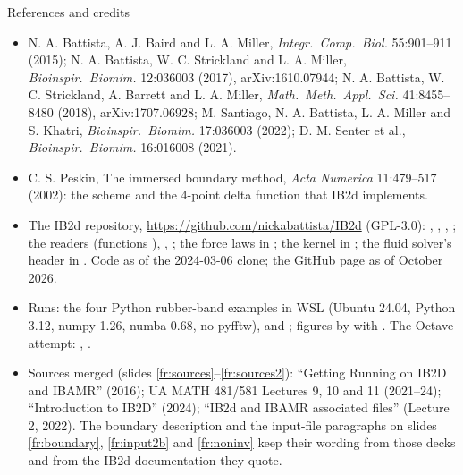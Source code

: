 \documentclass[aspectratio=169,11pt]{beamer}
\begin{document}
\begin{frame}{References and credits}
\label{fr:refs}
\scriptsize
\begin{itemize}
  \item N. A. Battista, A. J. Baird and L. A. Miller, \emph{Integr.\ Comp.\ Biol.} 55:901--911 (2015); N. A. Battista, W. C. Strickland and L. A. Miller, \emph{Bioinspir.\ Biomim.} 12:036003 (2017), arXiv:1610.07944; N. A. Battista, W. C. Strickland, A. Barrett and L. A. Miller, \emph{Math.\ Meth.\ Appl.\ Sci.} 41:8455--8480 (2018), arXiv:1707.06928; M. Santiago, N. A. Battista, L. A. Miller and S. Khatri, \emph{Bioinspir.\ Biomim.} 17:036003 (2022); D. M. Senter et al., \emph{Bioinspir.\ Biomim.} 16:016008 (2021).
  \item C. S. Peskin, The immersed boundary method, \emph{Acta Numerica} 11:479--517 (2002): the scheme and the 4-point delta function that IB2d implements.
  \item The IB2d repository, \url{https://github.com/nickabattista/IB2d} (GPL-3.0): , , , ; the readers  (functions ), , ; the force laws in ; the kernel in ; the fluid solver's header in . Code as of the 2024-03-06 clone; the GitHub page as of October 2026.
  \item Runs: the four Python rubber-band examples in WSL (Ubuntu 24.04, Python 3.12, numpy 1.26, numba 0.68, no pyfftw),  and ; figures by  with . The Octave attempt: , .
  \item Sources merged (slides \ref{fr:sources}--\ref{fr:sources2}): ``Getting Running on IB2D and IBAMR'' (2016); UA MATH 481/581 Lectures 9, 10 and 11 (2021--24); ``Introduction to IB2D'' (2024); ``IB2d and IBAMR associated files'' (Lecture 2, 2022). The boundary description and the input-file paragraphs on slides \ref{fr:boundary}, \ref{fr:input2b} and \ref{fr:noninv} keep their wording from those decks and from the IB2d documentation they quote.
\end{itemize}
\end{frame}
\end{document}

